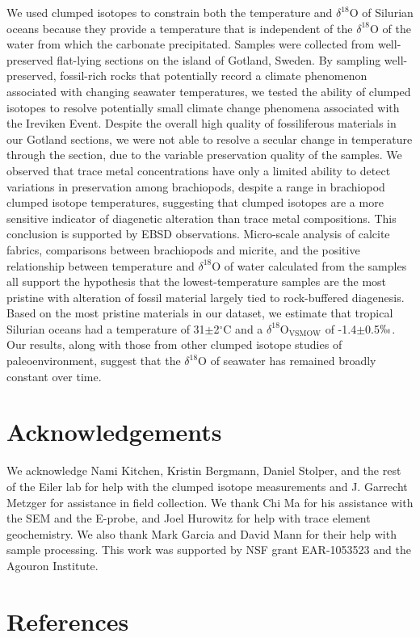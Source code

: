 \documentclass[5p, authoryear]{elsarticle}
\begin{document}
We used clumped isotopes to constrain both the temperature and $\delta^{18}$O of Silurian oceans because they provide a temperature that is independent of the $\delta^{18}$O of the water from which the carbonate precipitated. Samples were collected from well-preserved flat-lying sections on the island of Gotland, Sweden. By sampling well-preserved, fossil-rich rocks that potentially record a climate phenomenon associated with changing seawater temperatures, we tested the ability of clumped isotopes to resolve potentially small climate change phenomena associated with the Ireviken Event. Despite the overall high quality of fossiliferous materials in our Gotland sections, we were not able to resolve a secular change in temperature through the section, due to the variable preservation quality of the samples. We observed that trace metal concentrations have only a limited ability to detect variations in preservation among brachiopods, despite a range in brachiopod clumped isotope temperatures, suggesting that clumped isotopes are a more sensitive indicator of diagenetic alteration than trace metal compositions. This conclusion is supported by EBSD observations. Micro-scale analysis of calcite fabrics, comparisons between brachiopods and micrite, and the positive relationship between temperature and $\delta^{18}$O of water calculated from the samples all support the hypothesis that the lowest-temperature samples are the most pristine with alteration of fossil material largely tied to rock-buffered diagenesis. Based on the most pristine materials in our dataset, we estimate that tropical Silurian oceans had a temperature of 31$\pm$2$^{\circ}$C and a $\delta^{18}$O$_{\text{VSMOW}}$ of -1.4$\pm$0.5$\permil$. Our results, along with those from other clumped isotope studies of paleoenvironment, suggest that the $\delta^{18}$O of seawater has remained broadly constant over time. 

\section*{Acknowledgements}

We acknowledge Nami Kitchen, Kristin Bergmann, Daniel Stolper, and the rest of the Eiler lab for help with the clumped isotope measurements and J. Garrecht Metzger for assistance in field collection. We thank Chi Ma for his assistance with the SEM and the E-probe, and Joel Hurowitz for help with trace element geochemistry. We also thank Mark Garcia and David Mann for their help with sample processing. This work was supported by NSF grant EAR-1053523 and the Agouron Institute.

\nocite{*}

\section*{References}


\end{document}
